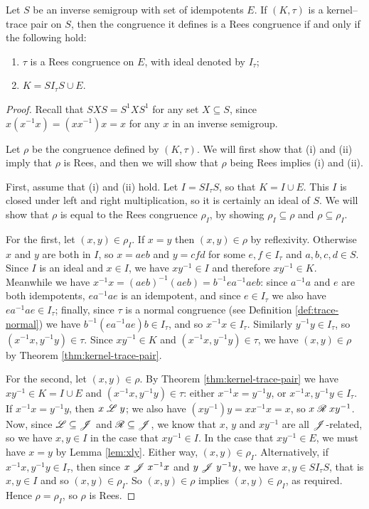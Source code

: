 \begin{theorem}
  \label{thm:kertr-to-rees}
  Let $S$ be an inverse semigroup with set of idempotents $E$.  If $(K, \tau)$
  is a kernel--trace pair on $S$, then the congruence it defines is a Rees
  congruence if and only if the following hold:
  \begin{enumerate}[\rm(i)]
  \item $\tau$ is a Rees congruence on $E$, with ideal denoted by $I_\tau$;
  \item $K = S I_\tau S \cup E$.
  \end{enumerate}
  \begin{proof}
    Recall that $SXS = S^1XS^1$ for any set $X \subseteq S$, since
    $x(x^{-1}x)=(xx^{-1})x=x$ for any $x$ in an inverse semigroup.

    Let $\rho$ be the congruence defined by $(K, \tau)$.  We will first show
    that (i) and (ii) imply that $\rho$ is Rees, and then we will show that
    $\rho$ being Rees implies (i) and (ii).

    First, assume that (i) and (ii) hold.  Let $I = S I_\tau S$, so that
    $K = I \cup E$.  This $I$ is closed under left and right multiplication, so
    it is certainly an ideal of $S$.  We will show that $\rho$ is equal to the
    Rees congruence $\rho_I$, by showing $\rho_I \subseteq \rho$ and
    $\rho \subseteq \rho_I$.

    For the first, let $(x,y) \in \rho_I$.  If $x=y$ then $(x,y) \in \rho$ by
    reflexivity.  Otherwise $x$ and $y$ are both in $I$, so $x = aeb$ and
    $y=cfd$ for some $e,f \in I_\tau$ and $a,b,c,d \in S$.  Since $I$ is an
    ideal and $x \in I$, we have $xy^{-1} \in I$ and therefore $xy^{-1} \in K$.
    Meanwhile we have $x^{-1}x = (aeb)^{-1}(aeb) = b^{-1}ea^{-1}aeb$: since
    $a^{-1}a$ and $e$ are both idempotents, $ea^{-1}ae$ is an idempotent, and
    since $e \in I_\tau$ we also have $ea^{-1}ae \in I_\tau$; finally, since
    $\tau$ is a normal congruence (see Definition \ref{def:trace-normal}) we have
    $b^{-1}(ea^{-1}ae)b \in I_\tau$, and so $x^{-1}x \in I_\tau$.  Similarly
    $y^{-1}y \in I_\tau$, so $(x^{-1}x, y^{-1}y) \in \tau$.  Since
    $xy^{-1} \in K$ and $(x^{-1}x, y^{-1}y) \in \tau$, we have $(x,y) \in \rho$
    by Theorem \ref{thm:kernel-trace-pair}.

    For the second, let $(x,y) \in \rho$.  By Theorem
    \ref{thm:kernel-trace-pair} we have $xy^{-1} \in K = I \cup E$ and
    $(x^{-1}x, y^{-1}y) \in \tau$: either $x^{-1}x=y^{-1}y$, or
    $x^{-1}x,y^{-1}y \in I_\tau$.  If $x^{-1}x = y^{-1}y$, then $x \mathrel{\mathscr{L}} y$; we
    also have $(xy^{-1})y = xx^{-1}x = x$, so $x \mathrel{\mathscr{R}} xy^{-1}$.  Now, since
    $\mathscr{L} \subseteq \mathscr{J}$ and $\mathscr{R} \subseteq \mathscr{J}$, we know that $x$, $y$ and
    $xy^{-1}$ are all $\mathrel{\mathscr{J}}$-related, so we have $x,y \in I$ in the case that
    $xy^{-1} \in I$.  In the case that $xy^{-1} \in E$, we must have $x=y$ by
    Lemma \ref{lem:xly}.  Either way, $(x,y) \in \rho_I$.  Alternatively, if
    $x^{-1}x, y^{-1}y \in I_\tau$, then since $x \mathrel{\mathscr{J}} x^{-1}x$ and
    $y \mathrel{\mathscr{J}} y^{-1}y$, we have $x,y \in SI_\tau S$, that is $x,y \in I$ and so
    $(x,y) \in \rho_I$.  So $(x,y) \in \rho$ implies $(x,y) \in \rho_I$, as required.
    Hence $\rho = \rho_I$, so $\rho$ is Rees.


\end{proof}
\end{theorem}
